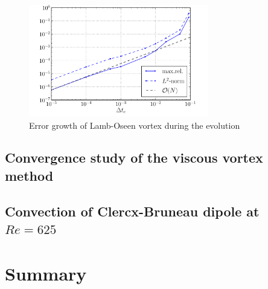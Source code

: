 	\begin{figure}[p]
	\centering
	\includegraphics[width=0.7\textwidth]{figures/lagrangian/lambOseen_convergence_dt_compressed.pdf}
	\caption{Error growth of Lamb-Oseen vortex during the evolution}
	\label{fig:lambOseen_convergence_dt_compressed}
	\end{figure}


\subsection{Convergence study of the viscous vortex method}

%
\subsection{Convection of Clercx-Bruneau dipole at $Re=625$}
%
\section{Summary}
%

